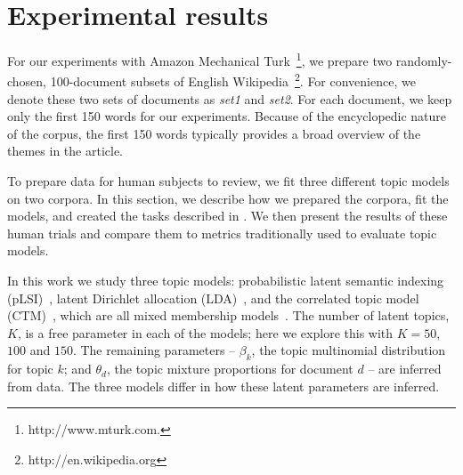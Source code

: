 \section{Experimental results}
\label{sec:experiments}

For our experiments with Amazon Mechanical
Turk~\footnote{http://www.mturk.com.}, we prepare two randomly-chosen,
100-document subsets of English
Wikipedia~\footnote{http://en.wikipedia.org}.  For convenience, we
denote these two sets of documents as \emph{set1} and \emph{set2}.
For each document, we keep only the first 150 words for our
experiments.  Because of the encyclopedic nature of the corpus, the
first 150 words typically provides a broad overview of the themes in
the article.

To
prepare data for human subjects to review, we fit three different
topic models on two corpora.  In this section, we describe how we
prepared the corpora, fit the models, and created the tasks described
in .  We then present the results of these human
trials and compare them to metrics traditionally used to evaluate
topic models.

In this work we study three topic models: probabilistic latent
semantic indexing (pLSI)~\cite{hofmann-99}, latent Dirichlet
allocation (LDA)~\cite{blei-03}, and the correlated topic model
(CTM)~\cite{blei-06}, which are all mixed membership
models~\cite{Erosheva:2004ph}.  The number of latent topics, $K$, is a free
parameter in each of the models; here we explore this with $K=50$,
$100$ and $150$.  The remaining parameters -- $\beta_k$, the topic
multinomial distribution for topic $k$; and $\theta_d$, the topic
mixture proportions for document $d$ -- are inferred from data.  The
three models differ in how these latent parameters are inferred.


